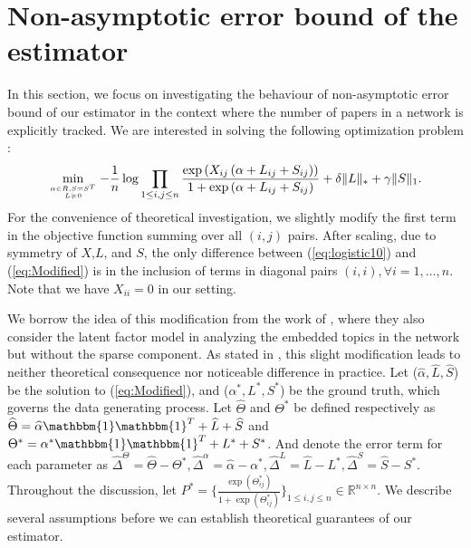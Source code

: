 \documentclass[AMS,STIX1COL]{WileyNJD-v2}
\begin{document}
{\section{Non-asymptotic error bound of the estimator}
\label{sec:theorem}
In this section, we focus on investigating the behaviour of non-asymptotic error bound of our estimator in the context where the number of papers in a network is explicitly tracked. We are interested in solving the following optimization problem :
\begin{equation}\label{eq:Modified}
\min\limits_{\alpha \in R, S = S^T \atop L \succcurlyeq 0}
-\frac{1}{n} \log \prod_{1\le i,j\le n}\frac{\exp\left(X_{ij}\left(\alpha+
L_{ij}+S_{ij}\right)\right)}{1+\exp\left(\alpha+
L_{ij}+S_{ij}\right)} + \delta \|L\|_\ast + \gamma \|S\|_1.
\end{equation}
For the convenience of theoretical investigation, we slightly modify the first term in the objective function summing over all $(i,j)$ pairs.
After scaling, due to symmetry of $X$,$L$, and $S$, the only difference between (\ref{eq:logistic10}) and (\ref{eq:Modified}) is in the inclusion of terms in diagonal pairs $(i,i),\forall i=1,\dots,n$.
Note that we have $X_{ii}=0$ in our setting. 

We borrow the idea of this modification from the work of \cite{ma2017exploration}, where they also consider the latent factor model in analyzing the embedded topics in the network but without the sparse component.
As stated in \cite{ma2017exploration}, this slight modification leads to neither theoretical consequence nor noticeable difference in practice.
Let ($\widehat{\alpha},\widehat{L},\widehat{S}$) be the solution to (\ref{eq:Modified}), and ($\alpha^{*},L^{*},S^{*}$) be the ground truth, which governs the data generating process.
Let $\widehat{\Theta}$ and $\Theta^{*}$ be defined respectively as $\widehat{\Theta} = \widehat{\alpha}\mathbbm{1}\mathbbm{1}^T+\widehat{L}+\widehat{S}$ and $\Theta^{*} = \alpha^{*}\mathbbm{1}\mathbbm{1}^T+L^{*}+S^{*}$.
And denote the error term for each parameter as $\widehat{\Delta}^{\Theta} = \widehat{\Theta}-\Theta^{*},
\widehat{\Delta}^{\alpha} = \widehat{\alpha}-\alpha^{*},
\widehat{\Delta}^L = \widehat{L}-L^{*},
\widehat{\Delta}^S = \widehat{S}-S^{*}.$
Throughout the discussion, let $P^{*}=\bigg\{\frac{\exp(\Theta_{ij}^{*})}{1+\exp(\Theta_{ij}^{*})}\bigg\}_{1 \leq i,j \leq n} \in \mathbb{R}^{n \times n}$.
We describe several assumptions before we can establish theoretical guarantees of our estimator.

}
\end{document}
